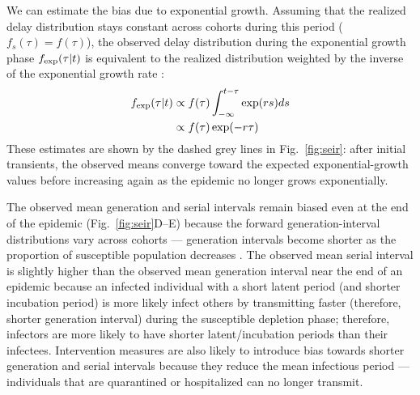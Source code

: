 \documentclass[12pt]{article}
\newcommand{\fref}[1]{Fig.~\ref{fig:#1}}
\begin{document}
We can estimate the bias due to exponential growth.
Assuming that the realized delay distribution stays constant across cohorts during this period ($f_s(\tau) = f(\tau)$), 
the observed delay distribution during the exponential growth phase $f_{\tiny\textrm{exp}}(\tau|t)$ is equivalent to the realized distribution weighted by the inverse of the exponential growth rate \citep{britton2019estimation}:
\begin{equation}
\begin{aligned}
f_{\tiny\textrm{exp}}(\tau|t) &\propto f(\tau) \int_{-\infty}^{t-\tau} \exp(rs) ds\\
&\propto f(\tau) \exp(-r\tau) \\
\end{aligned}
\label{eq:exp}
\end{equation}
These estimates are shown by the dashed grey lines in \fref{seir}: after initial transients, the observed means converge toward the expected exponential-growth values before increasing again as the epidemic no longer grows exponentially.

The observed mean generation and serial intervals remain biased even at the end of the epidemic (\fref{seir}D--E) because the forward generation-interval distributions vary across cohorts --- generation intervals become shorter as the proportion of susceptible population decreases \citep{champredon2015intrinsic}.
The observed mean serial interval is slightly higher than the observed mean generation interval near the end of an epidemic because an infected individual with a short latent period (and shorter incubation period) is more likely infect others by transmitting faster (therefore, shorter generation interval) during the susceptible depletion phase; therefore, infectors are more likely to have shorter latent/incubation periods than their infectees.
Intervention measures are also likely to introduce bias towards shorter generation and serial intervals because they reduce the mean infectious period --- individuals that are quarantined or hospitalized can no longer transmit.
\end{document}
